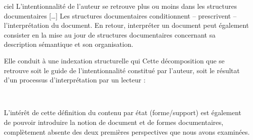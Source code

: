 
ciel{
	L’intentionnalité de l’auteur se retrouve plus ou moins dans les structures documentaires [\dots]
	Les structures documentaires conditionnent – prescrivent – l’interprétation du document. 
	En retour, interpréter un document peut également consister en la mise au jour de structures documentaires concernant sa description sémantique et son organisation.}







Elle conduit à une indexation structurelle qui 
Cette décomposition que  se retrouve soit le guide de l'intentionnalité constitué par l'auteur, soit le résultat d'un processus d'interprétation par un lecteur :

\






 







L'intérêt de cette définition du contenu par état (forme/support) est également de pouvoir introduire la notion de document et de formes documentaires, complètement absente des deux premières perspectives que nous avons examinées.


